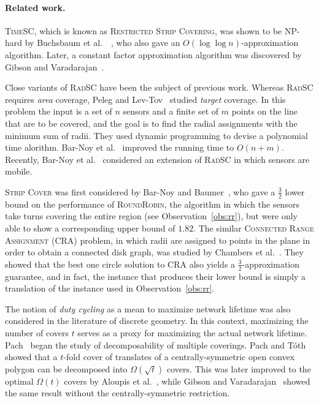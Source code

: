 \documentclass[11pt]{article}
\newcommand{\threehalves}{\frac{3}{2}}
\newcommand{\strip}{\textsc{Strip Cover}\xspace}
\newcommand{\srsc}{\textsc{RadSC}\xspace}
\newcommand{\stsc}{\textsc{TimeSC}\xspace}
\newcommand{\rr}{\textsc{RoundRobin}\xspace}
\begin{document}
\paragraph*{\bf Related work.}
\stsc,
which is known as \textsc{Restricted Strip Covering},
was shown to be NP-hard by Buchsbaum et
al.~~\cite{buchsbaum2007restricted}, who also gave an $O(\log \log
n)$-approximation algorithm.  Later, a constant factor approximation
algorithm was discovered by Gibson and
Varadarajan~\cite{gibson2009decomposing}.



Close variants of \srsc have been the subject of previous work.
Whereas \srsc requires \emph{area} coverage, Peleg and
Lev-Tov~\cite{lev2005polynomial} studied \emph{target} coverage.  In
this problem the input is a set of $n$ sensors and a finite set of $m$
points on the line that are to be covered, and the goal is to find the
radial assignments with the minimum sum of radii.  They used dynamic
programming to devise a polynomial time alorithm.  Bar-Noy et
al.~\cite{bar2009cheap} improved the running time to $O(n+m)$.
Recently, Bar-Noy et al.~\cite{BRT13} considered an extension of \srsc
in which sensors are mobile.

\strip was first considered by Bar-Noy and
Baumer~\cite{barnoy2011maximizing}, who gave a $\threehalves$ lower
bound on the performance of \rr, the algorithm in which the sensors
take turns covering the entire region (see Observation~\ref{obs:rr}),
but were only able to show a corresponding upper bound of $1.82$.
The similar \textsc{Connected Range Assignment} (CRA) problem, in
which radii are assigned to points in the plane in order to obtain a
connected disk graph, was studied by Chambers et
al.~\cite{chambers2011connecting}. They showed that the best one
circle solution to CRA also yields a $\threehalves$-approximation
guarantee, and in fact, the instance that produces their lower bound
is simply a translation of the instance used in
Observation~\ref{obs:rr}.

The notion of \emph{duty cycling} as a mean to maximize network
lifetime was also considered in the literature of discrete geometry.  In
this context, maximizing the number of covers $t$ serves as a proxy
for maximizing the actual network lifetime.
Pach~\cite{pach1986covering} began the study of decomposability of
multiple coverings.
Pach and T\'{o}th~\cite{pach2009decomposition} showed that a $t$-fold
cover of translates of a centrally-symmetric open convex polygon can
be decomposed into $\Omega(\sqrt{t})$ covers. This
was later improved to the optimal $\Omega(t)$ covers by Aloupis et
al.~\cite{aloupis2010decomposition}, while Gibson and
Varadarajan~\cite{gibson2009decomposing} showed the same result
without the centrally-symmetric restriction.
\end{document}
